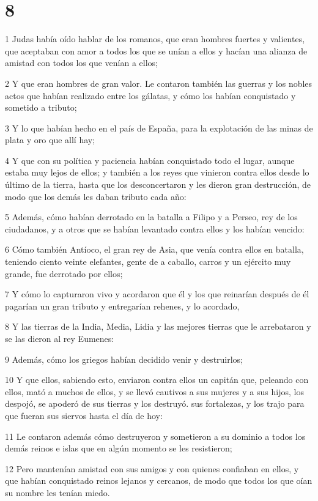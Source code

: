 \chapter{8}

\par 1 Judas había oído hablar de los romanos, que eran hombres fuertes y valientes, que aceptaban con amor a todos los que se unían a ellos y hacían una alianza de amistad con todos los que venían a ellos;
\par 2 Y que eran hombres de gran valor. Le contaron también las guerras y los nobles actos que habían realizado entre los gálatas, y cómo los habían conquistado y sometido a tributo;
\par 3 Y lo que habían hecho en el país de España, para la explotación de las minas de plata y oro que allí hay;
\par 4 Y que con su política y paciencia habían conquistado todo el lugar, aunque estaba muy lejos de ellos; y también a los reyes que vinieron contra ellos desde lo último de la tierra, hasta que los desconcertaron y les dieron gran destrucción, de modo que los demás les daban tributo cada año:
\par 5 Además, cómo habían derrotado en la batalla a Filipo y a Perseo, rey de los ciudadanos, y a otros que se habían levantado contra ellos y los habían vencido:
\par 6 Cómo también Antíoco, el gran rey de Asia, que venía contra ellos en batalla, teniendo ciento veinte elefantes, gente de a caballo, carros y un ejército muy grande, fue derrotado por ellos;
\par 7 Y cómo lo capturaron vivo y acordaron que él y los que reinarían después de él pagarían un gran tributo y entregarían rehenes, y lo acordado,
\par 8 Y las tierras de la India, Media, Lidia y las mejores tierras que le arrebataron y se las dieron al rey Eumenes:
\par 9 Además, cómo los griegos habían decidido venir y destruirlos;
\par 10 Y que ellos, sabiendo esto, enviaron contra ellos un capitán que, peleando con ellos, mató a muchos de ellos, y se llevó cautivos a sus mujeres y a sus hijos, los despojó, se apoderó de sus tierras y los destruyó. sus fortalezas, y los trajo para que fueran sus siervos hasta el día de hoy:
\par 11 Le contaron además cómo destruyeron y sometieron a su dominio a todos los demás reinos e islas que en algún momento se les resistieron;
\par 12 Pero mantenían amistad con sus amigos y con quienes confiaban en ellos, y que habían conquistado reinos lejanos y cercanos, de modo que todos los que oían su nombre les tenían miedo.
